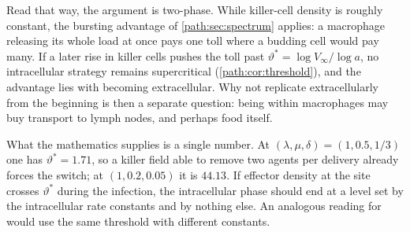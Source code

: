Read that way, the argument is two-phase. While killer-cell density is
roughly constant, the bursting advantage of \cref{path:sec:spectrum}
applies: a macrophage releasing its whole load at once pays one toll where
a budding cell would pay many. If a later rise in killer cells pushes the
toll past $\vartheta^{\ast}=\log V_\infty/\log a$, no intracellular strategy
remains supercritical (\cref{path:cor:threshold}), and the advantage lies
with becoming extracellular. Why not replicate extracellularly from the
beginning is then a separate question: being within macrophages may buy
transport to lymph nodes, and perhaps food itself.

%
%
%
%

What the mathematics supplies is a single number. At
$(\lambda,\mu,\delta)=(1,0.5,1/3)$ one has $\vartheta^{\ast}=1.71$, so a
killer field able to remove two agents per delivery already forces the
switch; at $(1,0.2,0.05)$ it is $44.13$. If effector density at the site
crosses $\vartheta^{\ast}$ during the infection, the intracellular phase
should end at a level set by the intracellular rate constants and by
nothing else. An analogous reading for \ft{}
\cite{oyston2004tularaemia,carruthers2020stochastic} would use the same
threshold with different constants.

\FloatBarrier
